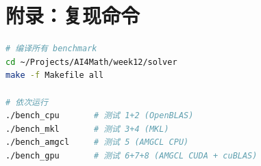 \documentclass[12pt,a4paper]{ctexart}
\begin{document}
\section*{附录：复现命令}

\begin{lstlisting}[language=bash]
# 编译所有 benchmark
cd ~/Projects/AI4Math/week12/solver
make -f Makefile all

# 依次运行
./bench_cpu       # 测试 1+2 (OpenBLAS)
./bench_mkl       # 测试 3+4 (MKL)
./bench_amgcl     # 测试 5 (AMGCL CPU)
./bench_gpu       # 测试 6+7+8 (AMGCL CUDA + cuBLAS)
\end{lstlisting}
\end{document}
